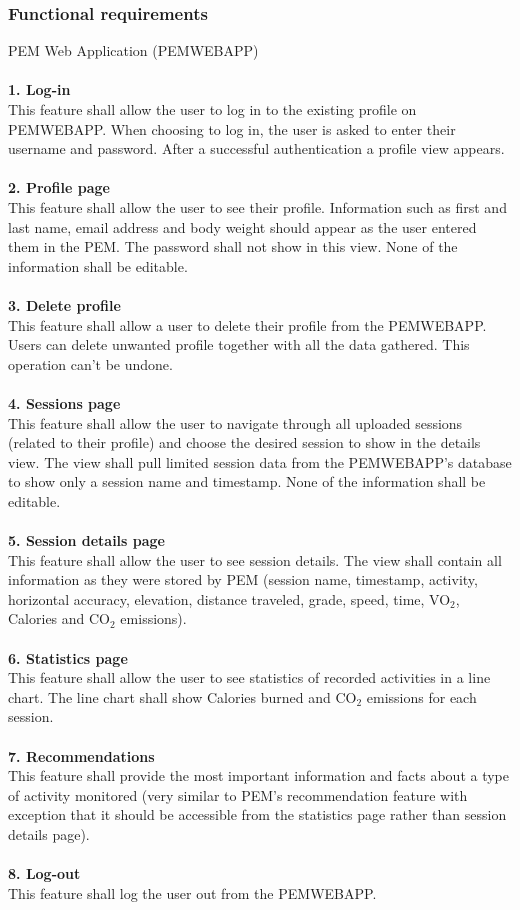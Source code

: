 \documentclass[12pt, a4paper]{report}   %
\begin{document}
\begin{enumerate}
\subsubsection{Functional requirements}
PEM Web Application (PEMWEBAPP)\\ \\
\textbf{1. Log-in}\\
This feature shall allow the user to log in to the existing profile on PEMWEBAPP. When choosing to log in, the user is asked to enter their username and password. After a successful authentication a profile view appears.\\ \\
\textbf{2. Profile page}\\
This feature shall allow the user to see their profile. Information such as first and last name, email address and body weight should appear as the user entered them in the PEM. The password shall not show in this view. None of the information shall be editable.\\ \\
\textbf{3. Delete profile}\\
This feature shall allow a user to delete their profile from the PEMWEBAPP. Users can delete unwanted profile together with all the data gathered. This operation can't be undone.\\ \\
\textbf{4. Sessions page}\\
This feature shall allow the user to navigate through all uploaded sessions (related to their profile) and choose the desired session to show in the details view. The view shall pull limited session data from the PEMWEBAPP's database to show only a session name and timestamp. None of the information shall be editable.\\ \\
\textbf{5. Session details page}\\
This feature shall allow the user to see session details. The view shall contain all information as they were stored by PEM (session name, timestamp, activity, horizontal accuracy, elevation, distance traveled, grade, speed, time, VO$_{2}$, Calories and CO$_{2}$ emissions).\\ \\
\textbf{6. Statistics page}\\
This feature shall allow the user to see statistics of recorded activities in a line chart. The line chart shall show Calories burned and CO$_{2}$ emissions for each session.\\ \\
\textbf{7. Recommendations}\\
This feature shall provide the most important information and facts about a type of activity monitored (very similar to PEM's recommendation feature with exception that it should be accessible from the statistics page rather than session details page).\\ \\
\textbf{8. Log-out}\\
This feature shall log the user out from the PEMWEBAPP.\\ \\



\end{enumerate}
\end{document}
